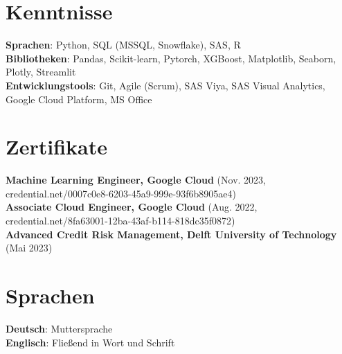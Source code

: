 \documentclass[letterpaper,11pt]{article}
\begin{document}
\section{Kenntnisse}
 \begin{itemize}[leftmargin=0.15in, label={}]
    \small{\item{
     \textbf{Sprachen}{: Python, SQL (MSSQL, Snowflake), SAS, R} \\
     \textbf{Bibliotheken}{: Pandas, Scikit-learn, Pytorch, XGBoost, Matplotlib, Seaborn, Plotly, Streamlit} \\
     \textbf{Entwicklungstools}{: Git, Agile (Scrum), SAS Viya, SAS Visual Analytics, Google Cloud Platform, MS Office} 
    }}
 \end{itemize}
 
\section{Zertifikate}
 \begin{itemize}[leftmargin=0.15in, label={}]
    \small{\item{
     \textbf{Machine Learning Engineer, Google Cloud }{(Nov. 2023, credential.net/0007c0e8-6203-45a9-999e-93f6b8905ae4)} \\
     \textbf{Associate Cloud Engineer, Google Cloud }{(Aug. 2022, credential.net/8fa63001-12ba-43af-b114-818dc35f0872)} \\
     \textbf{Advanced Credit Risk Management, Delft University of Technology }{(Mai 2023)} 
    }}
 \end{itemize}

\section{Sprachen}
 \begin{itemize}[leftmargin=0.15in, label={}]
    \small{\item{
     \textbf{Deutsch}{: Muttersprache} \\
     \textbf{Englisch}{: Fließend in Wort und Schrift} \\
    }}
 \end{itemize}


\end{document}

